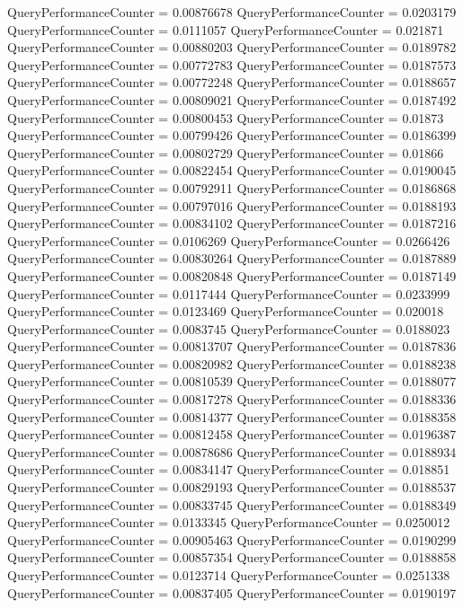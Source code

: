 \documentclass[9pt]{article}
\theoremstyle{plain}
\theoremstyle{definition}
\theoremstyle{remark}
\numberwithin{equation}{section}
\begin{document}
QueryPerformanceCounter  =  0.00876678
QueryPerformanceCounter  =  0.0203179
QueryPerformanceCounter  =  0.0111057
QueryPerformanceCounter  =  0.021871
QueryPerformanceCounter  =  0.00880203
QueryPerformanceCounter  =  0.0189782
QueryPerformanceCounter  =  0.00772783
QueryPerformanceCounter  =  0.0187573
QueryPerformanceCounter  =  0.00772248
QueryPerformanceCounter  =  0.0188657
QueryPerformanceCounter  =  0.00809021
QueryPerformanceCounter  =  0.0187492
QueryPerformanceCounter  =  0.00800453
QueryPerformanceCounter  =  0.01873
QueryPerformanceCounter  =  0.00799426
QueryPerformanceCounter  =  0.0186399
QueryPerformanceCounter  =  0.00802729
QueryPerformanceCounter  =  0.01866
QueryPerformanceCounter  =  0.00822454
QueryPerformanceCounter  =  0.0190045
QueryPerformanceCounter  =  0.00792911
QueryPerformanceCounter  =  0.0186868
QueryPerformanceCounter  =  0.00797016
QueryPerformanceCounter  =  0.0188193
QueryPerformanceCounter  =  0.00834102
QueryPerformanceCounter  =  0.0187216
QueryPerformanceCounter  =  0.0106269
QueryPerformanceCounter  =  0.0266426
QueryPerformanceCounter  =  0.00830264
QueryPerformanceCounter  =  0.0187889
QueryPerformanceCounter  =  0.00820848
QueryPerformanceCounter  =  0.0187149
QueryPerformanceCounter  =  0.0117444
QueryPerformanceCounter  =  0.0233999
QueryPerformanceCounter  =  0.0123469
QueryPerformanceCounter  =  0.020018
QueryPerformanceCounter  =  0.0083745
QueryPerformanceCounter  =  0.0188023
QueryPerformanceCounter  =  0.00813707
QueryPerformanceCounter  =  0.0187836
QueryPerformanceCounter  =  0.00820982
QueryPerformanceCounter  =  0.0188238
QueryPerformanceCounter  =  0.00810539
QueryPerformanceCounter  =  0.0188077
QueryPerformanceCounter  =  0.00817278
QueryPerformanceCounter  =  0.0188336
QueryPerformanceCounter  =  0.00814377
QueryPerformanceCounter  =  0.0188358
QueryPerformanceCounter  =  0.00812458
QueryPerformanceCounter  =  0.0196387
QueryPerformanceCounter  =  0.00878686
QueryPerformanceCounter  =  0.0188934
QueryPerformanceCounter  =  0.00834147
QueryPerformanceCounter  =  0.018851
QueryPerformanceCounter  =  0.00829193
QueryPerformanceCounter  =  0.0188537
QueryPerformanceCounter  =  0.00833745
QueryPerformanceCounter  =  0.0188349
QueryPerformanceCounter  =  0.0133345
QueryPerformanceCounter  =  0.0250012
QueryPerformanceCounter  =  0.00905463
QueryPerformanceCounter  =  0.0190299
QueryPerformanceCounter  =  0.00857354
QueryPerformanceCounter  =  0.0188858
QueryPerformanceCounter  =  0.0123714
QueryPerformanceCounter  =  0.0251338
QueryPerformanceCounter  =  0.00837405
QueryPerformanceCounter  =  0.0190197
\end{document}
